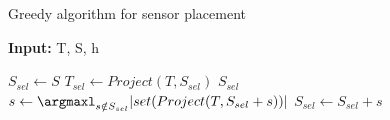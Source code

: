 \begin{algorithm}
	\caption{Greedy algorithm for sensor placement}
	\label{algo:greedyalgorithm}
	\textbf{Input:} T, S, h
	\begin{algorithmic}
		\State $S_{sel} \gets S$
		\State $T_{sel} \gets Project (T,S_{sel} ) $
		\Return $S_{sel}$
		\EndIf
		\State $ s \gets \argmaxl_{s\notin {S_{sel}}} |set(Project(T,S_{sel} + s))|$
		\State $ S_{sel} \gets S_{sel} + s$
		\EndWhile
	\end{algorithmic}
\end{algorithm}
